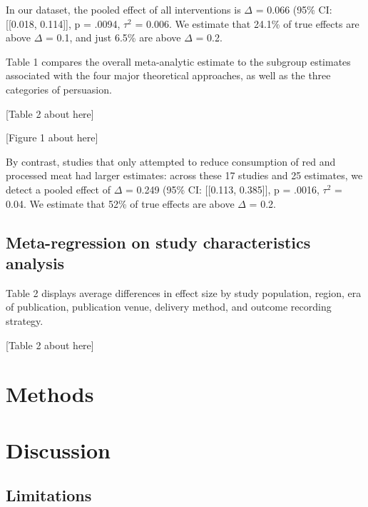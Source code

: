 \documentclass[sn-nature,referee,pdflatex]{sn-jnl}
\begin{document}
In our dataset, the pooled effect of all interventions is \(\Delta\) =
0.066 (95\% CI: {[}{[}0.018, 0.114{]}{]}, p = .0094, \(\tau^2\) = 0.006.
We estimate that 24.1\% of true effects are above \(\Delta\) = 0.1, and
just 6.5\% are above \(\Delta\) = 0.2.

Table 1 compares the overall meta-analytic estimate to the subgroup
estimates associated with the four major theoretical approaches, as well
as the three categories of persuasion.

\begin{center}
[Table 2 about here]
\end{center}

\begin{center}
[Figure 1 about here]
\end{center}

By contrast, studies that only attempted to reduce consumption of red
and processed meat had larger estimates: across these 17 studies and 25
estimates, we detect a pooled effect of \(\Delta\) = 0.249 (95\% CI:
{[}{[}0.113, 0.385{]}{]}, p = .0016, \(\tau^2\) = 0.04. We estimate that
52\% of true effects are above \(\Delta\) = 0.2.

\subsection{Meta-regression on study characteristics
analysis}\label{meta-regression-on-study-characteristics-analysis}

Table 2 displays average differences in effect size by study population,
region, era of publication, publication venue, delivery method, and
outcome recording strategy.

\begin{center}
[Table 2 about here]
\end{center}

\section{Methods}\label{sec3}

\section{Discussion}\label{discussion}

\subsection{Limitations}\label{limitations}
\end{document}
